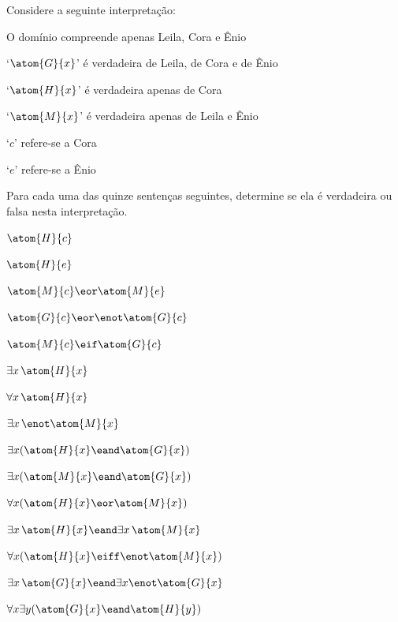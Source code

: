\problempart
\label{pr.TorF2}
Considere a seguinte interpretação:	
	\begin{ebullet}
		\item O domínio compreende apenas Leila, Cora e Ênio
		\item `$\atom{G}{x}$' é verdadeira de Leila, de Cora e de Ênio
		\item `$\atom{H}{x}$' é verdadeira apenas de Cora
		\item `$\atom{M}{x}$' é verdadeira apenas de Leila e Ênio
		\item `$c$' refere-se a Cora
		\item `$e$' refere-se a Ênio
	\end{ebullet}
Para cada uma das quinze sentenças seguintes, determine se ela é verdadeira ou falsa nesta interpretação.
\begin{earg}
\item $\atom{H}{c} $
\item $\atom{H}{e} $
\item $\atom{M}{c}  \eor \atom{M}{e}$
\item $\atom{G}{c}  \eor \enot \atom{G}{c}$
\item $\atom{M}{c}  \eif \atom{G}{c}$
\item $\exists x\, \atom{H}{x}$
\item $\forall x\, \atom{H}{x}$
\item $\exists x\, \enot \atom{M}{x}$
\item $\exists x(\atom{H}{x} \eand \atom{G}{x})$
\item $\exists x(\atom{M}{x} \eand \atom{G}{x})$
\item $\forall x(\atom{H}{x} \eor \atom{M}{x})$
\item $\exists x\, \atom{H}{x} \eand \exists x\, \atom{M}{x}$
\item $\forall x(\atom{H}{x} \eiff \enot \atom{M}{x})$
\item $\exists x\, \atom{G}{x} \eand \exists x \enot \atom{G}{x}$
\item $\forall x\exists y(\atom{G}{x} \eand \atom{H}{y})$
\end{earg}

